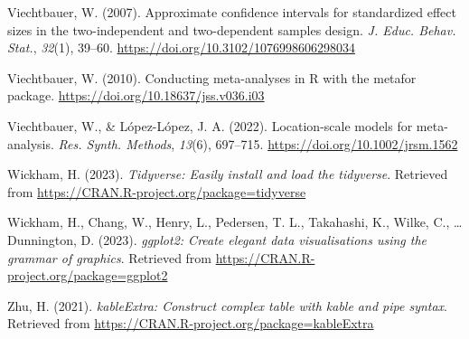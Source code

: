 \documentclass[
  man,floatsintext]{apa6}
\newlength{\cslhangindent}
\newlength{\cslentryspacingunit} %
\newenvironment{CSLReferences}[2] %
 {%
  \setlength{\parindent}{0pt}
  \ifodd #1
  \let\oldpar\par
  \def\par{\hangindent=\cslhangindent\oldpar}
  \fi
  \setlength{\parskip}{#2\cslentryspacingunit}
 }%
 {}
\begin{document}
\begin{CSLReferences}{1}{0}
\leavevmode{}%
Viechtbauer, W. (2007). Approximate confidence intervals for standardized effect sizes in the two-independent and two-dependent samples design. \emph{J. Educ. Behav. Stat.}, \emph{32}(1), 39--60. \url{https://doi.org/10.3102/1076998606298034}

\leavevmode{}%
Viechtbauer, W. (2010). Conducting meta-analyses in {R} with the {metafor} package. \url{https://doi.org/10.18637/jss.v036.i03}

\leavevmode{}%
Viechtbauer, W., \& López-López, J. A. (2022). Location-scale models for meta-analysis. \emph{Res. Synth. Methods}, \emph{13}(6), 697--715. \url{https://doi.org/10.1002/jrsm.1562}

\leavevmode{}%
Wickham, H. (2023). \emph{Tidyverse: Easily install and load the tidyverse}. Retrieved from \url{https://CRAN.R-project.org/package=tidyverse}

\leavevmode{}%
Wickham, H., Chang, W., Henry, L., Pedersen, T. L., Takahashi, K., Wilke, C., \ldots{} Dunnington, D. (2023). \emph{ggplot2: Create elegant data visualisations using the grammar of graphics}. Retrieved from \url{https://CRAN.R-project.org/package=ggplot2}

\leavevmode{}%
Zhu, H. (2021). \emph{kableExtra: Construct complex table with kable and pipe syntax}. Retrieved from \url{https://CRAN.R-project.org/package=kableExtra}

\end{CSLReferences}
\end{document}
